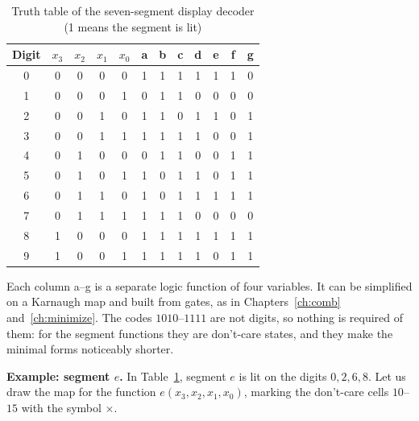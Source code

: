 \begin{table}[H]
\centering
\caption{Truth table of the seven-segment display decoder (1 means the segment is lit)}
\label{tab:7seg}
\small
\begin{tabular}{c|cccc|ccccccc}
\toprule
Digit & $x_3$ & $x_2$ & $x_1$ & $x_0$ & a & b & c & d & e & f & g \\
\midrule
0 & 0&0&0&0 & 1&1&1&1&1&1&0 \\
1 & 0&0&0&1 & 0&1&1&0&0&0&0 \\
2 & 0&0&1&0 & 1&1&0&1&1&0&1 \\
3 & 0&0&1&1 & 1&1&1&1&0&0&1 \\
4 & 0&1&0&0 & 0&1&1&0&0&1&1 \\
5 & 0&1&0&1 & 1&0&1&1&0&1&1 \\
6 & 0&1&1&0 & 1&0&1&1&1&1&1 \\
7 & 0&1&1&1 & 1&1&1&0&0&0&0 \\
8 & 1&0&0&0 & 1&1&1&1&1&1&1 \\
9 & 1&0&0&1 & 1&1&1&1&0&1&1 \\
\bottomrule
\end{tabular}
\end{table}

Each column a--g is a separate logic function of four
variables. It can be simplified on a Karnaugh map and built from gates, as in
Chapters~\ref{ch:comb} and~\ref{ch:minimize}. The codes $1010$--$1111$ are
not digits, so nothing is required of them: for the
segment functions they are don't-care states, and they make the
minimal forms noticeably shorter.

\textbf{Example: segment $e$.} In Table~\ref{tab:7seg}, segment $e$ is lit on
the digits $0,2,6,8$. Let us draw the map for the function $e(x_3,x_2,x_1,x_0)$,
marking the don't-care cells $10$--$15$ with the symbol $\times$.

